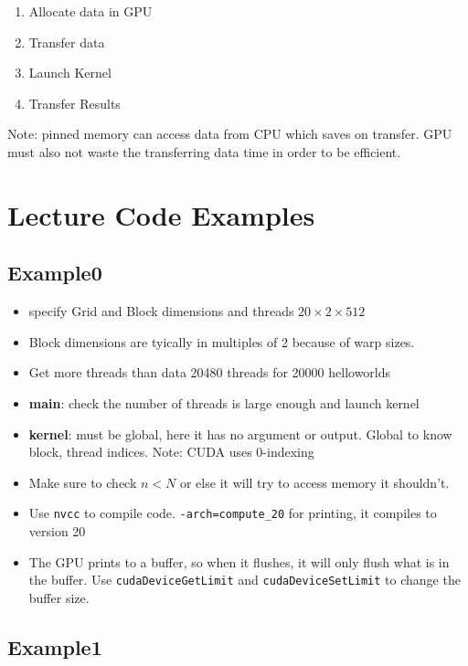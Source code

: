 \documentclass[11pt]{article}
\begin{document}
\begin{enumerate}
\item Allocate data in GPU
\item Transfer data
\item Launch Kernel
\item Transfer Results
\end{enumerate}
Note: pinned memory can access data from CPU which saves on
transfer.  GPU must also not waste the transferring data time in
order to be efficient.
\section{Lecture Code Examples}
\label{sec-6}
\subsection{Example0}
\label{sec-6-1}

\begin{itemize}
\item specify Grid and Block dimensions and threads $20\times2\times512$
\item Block dimensions are tyically in multiples of 2 because of warp sizes.
\item Get more threads than data 20480 threads for 20000 helloworlds
\item \textbf{main}: check the number of threads is large enough and launch kernel
\item \textbf{kernel}: must be global, here it has no argument or output.  Global to know
  block, thread indices.  Note: CUDA uses 0-indexing
\item Make sure to check $n<N$ or else it will try to access memory it shouldn't.
\item Use \verb~nvcc~ to compile code.  \verb~-arch=compute_20~ for printing, it
  compiles to version 20
\item The GPU prints to a buffer, so when it flushes, it will only flush
  what is in the buffer.  Use \verb~cudaDeviceGetLimit~ and
  \verb~cudaDeviceSetLimit~ to change the buffer size.
\end{itemize}
\subsection{Example1}
\label{sec-6-2}
\end{document}
